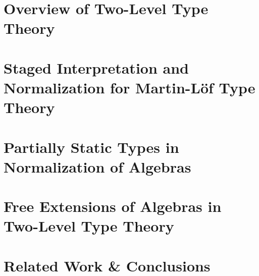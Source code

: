 \documentclass[acmsmall,review,screen]{acmart}
\theoremstyle{remark}
\begin{document}
\section{Overview of Two-Level Type Theory}\label{sec:2ltt}

\section{Staged Interpretation and Normalization for Martin-Löf Type Theory}\label{sec:ps-interp}

\section{Partially Static Types in Normalization of Algebras}\label{sec:ps-alg}

\section{Free Extensions of Algebras in Two-Level Type Theory}\label{sec:frex}

\section{Related Work \& Conclusions}\label{sec:conclusion}









\end{document}
